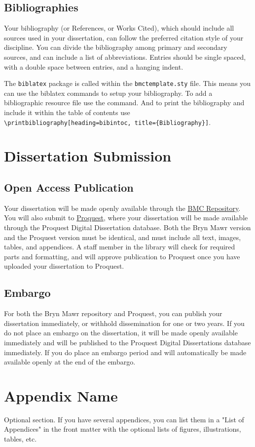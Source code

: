 \documentclass[12pt]{report}
\begin{document}
\section{Bibliographies}
Your bibliography (or References, or Works Cited), which should include all sources used in your dissertation, can follow the preferred citation style of your discipline. You can divide the bibliography among primary and secondary sources, and can include a list of abbreviations. Entries should be single spaced, with a double space between entries, and a hanging indent.~\parencite{schaffner_temporal_2014, batchelor_1953}

The \verb|biblatex| package is called within the \verb|bmctemplate.sty| file. This means you can use the biblatex commands to setup your bibliography. 
To add a bibliographic resource file use the \verb|| command. And to print the bibliography and include it within the table of contents use \verb|\printbibliography[heading=bibintoc, title={Bibliography}]|.

\chapter{Dissertation Submission}

\section{Open Access Publication}
Your dissertation will be made openly available through the \href{https://repository.brynmawr.edu/}{BMC Repository}. You will also submit to \href{https://www.proquest.com/}{Proquest}, where your dissertation will be made available through the Proquest Digital Dissertation database. Both the Bryn Mawr version and the Proquest version must be identical, and must include all text, images, tables, and appendices. A staff member in the library will check for required parts and formatting, and will approve publication to Proquest once you have uploaded your dissertation to Proquest.
\section{Embargo}
For both the Bryn Mawr repository and Proquest, you can publish your dissertation immediately, or withhold dissemination for one or two years. If you do not place an embargo on the dissertation, it will be made openly available immediately and will be published to the Proquest Digital Dissertations database immediately. If you do place an embargo period and will automatically be made available openly at the end of the embargo. 
\appendix
\chapter{Appendix Name}
Optional section. If you have several appendices, you can list them in a "List of Appendices" in the front matter with the optional lists of figures, illustrations, tables, etc.

\singlespacing
\printbibliography[heading=bibintoc, title={Bibliography}]
\end{document}
